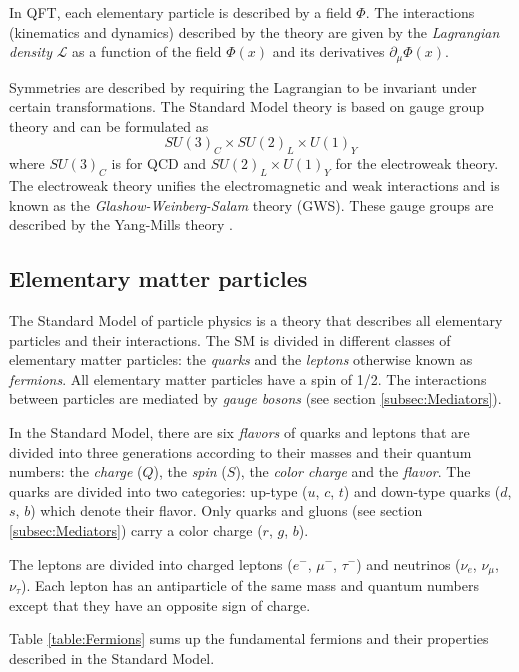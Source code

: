 In QFT, each elementary particle is described by a field $\Phi$. The interactions (kinematics and dynamics) described by the theory are given by the \textit{Lagrangian density} $\mathcal{L}$ as a function of the field $\Phi(x)$ and its derivatives $\partial_{\mu}\Phi(x)$.

Symmetries are described by requiring the Lagrangian to be invariant under certain transformations. The Standard Model theory is based on gauge group theory and can be formulated as
\begin{equation}
  SU(3)_{C} \times SU(2)_{L} \times U(1)_{Y}
\end{equation}
where $SU(3)_{C}$ is for QCD and $SU(2)_{L} \times U(1)_{Y}$ for the electroweak theory. The electroweak theory unifies the electromagnetic and weak interactions and is known as the \textit{Glashow-Weinberg-Salam} theory (GWS). These gauge groups are described by the Yang-Mills theory \cite{Yang:1954ek}.

\subsection{Elementary matter particles}

The Standard Model of particle physics is a theory that describes all elementary particles and their interactions. The SM is divided in different classes of elementary matter particles: the \textit{quarks} and the \textit{leptons} otherwise known as \textit{fermions}. All elementary matter particles have a spin of 1/2. The interactions between particles are mediated by \textit{gauge bosons} (see section \ref{subsec:Mediators}).

In the Standard Model, there are six \textit{flavors} of quarks and leptons that are divided into three generations according to their masses and their quantum numbers: the \textit{charge} ($Q$), the \textit{spin} ($S$), the \textit{color charge} and the \textit{flavor}. The quarks are divided into two categories: up-type ($u$, $c$, $t$) and down-type quarks ($d$, $s$, $b$) which denote their flavor. Only quarks and gluons (see section \ref{subsec:Mediators}) carry a color charge ($r$, $g$, $b$).

The leptons are divided into charged leptons ($e^-$, $\mu^-$, $\tau^-$) and neutrinos ($\nu_e$, $\nu_{\mu}$, $\nu_{\tau}$). Each lepton has an antiparticle of the same mass and quantum numbers except that they have an opposite sign of charge.

Table \ref{table:Fermions} sums up the fundamental fermions and their properties described in the Standard Model.

